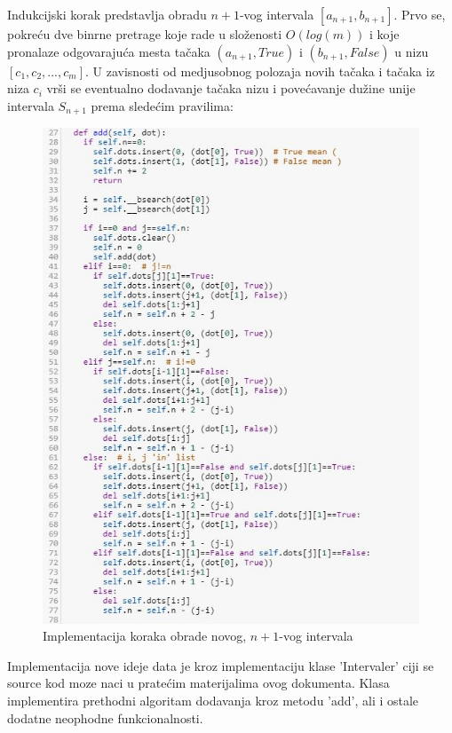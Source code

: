 \documentclass[a4paper]{article}
\begin{document}
Indukcijski korak predstavlja obradu $n+1$-vog intervala $[a_{n+1}, b_{n+1}]$. Prvo se, pokreću dve binrne pretrage koje rade u složenosti $O(log(m))$ i koje pronalaze odgovarajuća mesta tačaka $(a_{n+1}, True)$ i $(b_{n+1}, False)$ u nizu $[c_1, c_2, ..., c_m]$. U zavisnosti od medjusobnog polozaja novih tačaka i tačaka iz niza $c_i$ vrši se eventualno dodavanje tačaka nizu i povećavanje dužine unije intervala $S_{n+1}$ prema sledećim pravilima: 

\begin{figure}[h!]
\includegraphics[scale=0.8]{add.JPG}
\caption{Implementacija koraka obrade novog, $n+1$-vog intervala}
\label{fig:add}
\end{figure}

\newpage
Implementacija nove ideje data je kroz implementaciju klase 'Intervaler' ciji se source kod moze naci u pratećim materijalima ovog dokumenta. Klasa implementira prethodni algoritam dodavanja kroz metodu 'add', ali i ostale dodatne neophodne funkcionalnosti.
\end{document}
